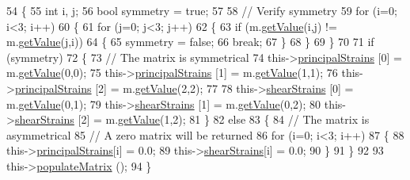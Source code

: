 \begin{DoxyCode}
54 \{
55   \textcolor{keywordtype}{int} i, j;
56   \textcolor{keywordtype}{bool} symmetry = \textcolor{keyword}{true};
57 
58   \textcolor{comment}{// Verify symmetry}
59   \textcolor{keywordflow}{for} (i=0; i<3; i++)
60     \{
61       \textcolor{keywordflow}{for} (j=0; j<3; j++)
62         \{
63           \textcolor{keywordflow}{if} (m.\hyperlink{classMatrix33_ab53b3e37ad830a87a804cf26311ba088}{getValue}(i,j) != m.\hyperlink{classMatrix33_ab53b3e37ad830a87a804cf26311ba088}{getValue}(j,i))
64             \{
65               symmetry = \textcolor{keyword}{false};
66               \textcolor{keywordflow}{break};
67             \}
68         \}
69     \}
70 
71   \textcolor{keywordflow}{if} (symmetry)
72     \{
73       \textcolor{comment}{// The matrix is symmetrical}
74       this->\hyperlink{classStrain_a172c6ef4593e35bc9280a2dafde61475}{principalStrains} [0] = m.\hyperlink{classMatrix33_ab53b3e37ad830a87a804cf26311ba088}{getValue}(0,0);
75       this->\hyperlink{classStrain_a172c6ef4593e35bc9280a2dafde61475}{principalStrains} [1] = m.\hyperlink{classMatrix33_ab53b3e37ad830a87a804cf26311ba088}{getValue}(1,1);
76       this->\hyperlink{classStrain_a172c6ef4593e35bc9280a2dafde61475}{principalStrains} [2] = m.\hyperlink{classMatrix33_ab53b3e37ad830a87a804cf26311ba088}{getValue}(2,2);
77 
78       this->\hyperlink{classStrain_afbc4d1b573860bda614a43f767b8b272}{shearStrains} [0] = m.\hyperlink{classMatrix33_ab53b3e37ad830a87a804cf26311ba088}{getValue}(0,1);
79       this->\hyperlink{classStrain_afbc4d1b573860bda614a43f767b8b272}{shearStrains} [1] = m.\hyperlink{classMatrix33_ab53b3e37ad830a87a804cf26311ba088}{getValue}(0,2);
80       this->\hyperlink{classStrain_afbc4d1b573860bda614a43f767b8b272}{shearStrains} [2] = m.\hyperlink{classMatrix33_ab53b3e37ad830a87a804cf26311ba088}{getValue}(1,2);
81     \}
82   \textcolor{keywordflow}{else}
83     \{
84       \textcolor{comment}{// The matrix is asymmetrical}
85       \textcolor{comment}{// A zero matrix will be returned}
86       \textcolor{keywordflow}{for} (i=0; i<3; i++)
87         \{
88           this->\hyperlink{classStrain_a172c6ef4593e35bc9280a2dafde61475}{principalStrains}[i] = 0.0;
89           this->\hyperlink{classStrain_afbc4d1b573860bda614a43f767b8b272}{shearStrains}[i] = 0.0;
90         \}
91     \}
92 
93   this->\hyperlink{classStrain_a53d0c01b18a8c70da97ad4aaeb924f14}{populateMatrix} ();
94 \}
\end{DoxyCode}


